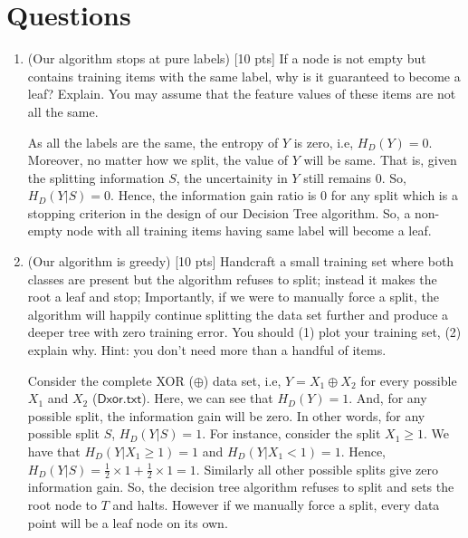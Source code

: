 \documentclass[a4paper]{article}
\theoremstyle{definition}
\newenvironment{soln}{
    \leavevmode\color{blue}\ignorespaces
}{}
\begin{document}
\section{Questions}
\begin{enumerate}
\item (Our algorithm stops at pure labels) [10 pts] If a node is not empty but contains training items with the same label, why is it guaranteed to become a leaf?  Explain. You may assume that the feature values of these items are not all the same. \\

\begin{soln}
    As all the labels are the same, the entropy of $Y$ is zero, i.e, $H_{D}(Y) = 0$.
    Moreover, no matter how we split, the value of $Y$ will be same. That is, given the splitting information $S$, the uncertainity in $Y$ still remains 0.
    So, $H_D(Y | S) = 0$.
    Hence, the information gain ratio is 0 for any split which is a stopping criterion in the design of our Decision Tree algorithm.
    So, a non-empty node with all training items having same label will become a leaf.
\end{soln}

\item (Our algorithm is greedy)  [10 pts] Handcraft a small training set where both classes are present but the algorithm refuses to split; instead it makes the root a leaf and stop;
Importantly, if we were to manually force a split, the algorithm will happily continue splitting the data set further and produce a deeper tree with zero training error.
You should (1) plot your training set, (2) explain why.  Hint: you don't need more than a handful of items. \\

\begin{soln}
    Consider the complete XOR ($\oplus$) data set, i.e, $Y = X_1 \oplus X_2$ for every possible $X_1$ and $X_2$ ($\mathsf{Dxor.txt}$).
    Here, we can see that $H_D(Y) = 1$.
    And, for any possible split, the information gain will be zero.
    In other words, for any possible split $S$, $H_D(Y | S) = 1$.
    For instance, consider the split $X_1 \geq 1$.
    We have that $H_D(Y | X_1 \geq 1) = 1$ and $H_D(Y | X_1 < 1) = 1$.
    Hence, $H_D(Y | S) = \frac{1}{2} \times 1 + \frac{1}{2} \times 1 = 1$.
    Similarly all other possible splits give zero information gain.
    So, the decision tree algorithm refuses to split and sets the root node to $T$ and halts.
    However if we manually force a split, every data point will be a leaf node on its own.


\end{soln}
\end{enumerate}
\end{document}
